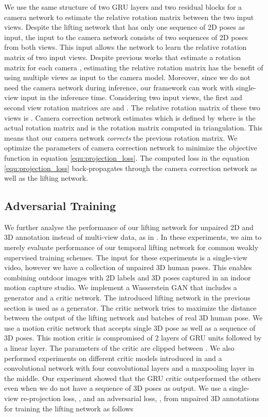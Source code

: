 \documentclass[10pt,twocolumn,letterpaper]{article}
\begin{document}
We use the same structure of two GRU layers and two residual blocks for a camera network to estimate the relative rotation matrix  between the two input views. Despite the lifting network that has only one sequence of 2D poses as input, the input to the camera network consists of two sequences of 2D poses from both views. This input allows the network to learn the relative rotation matrix of two input views. Despite previous works that estimate a rotation matrix for each camera \cite{wandt2020canonpose}, estimating the relative rotation matrix has the benefit of using multiple views as input to the camera model. Moreover, since we do not need the camera network during inference, our framework can work with single-view input in the inference time. Considering two input views, the first and second view rotation matrices are  and . The relative rotation matrix of these two views is . Camera correction network estimates   which is defined by  where  is the actual rotation matrix and  is the rotation matrix computed in triangulation. This means that our camera network \textit{corrects} the previous rotation matrix. We optimize the parameters of camera correction network to minimize the objective function in equation \ref{equ:projection_loss}. The computed loss in the equation \ref{equ:projection_loss} back-propagates through the camera correction network as well as the lifting network.   



\subsection{Adversarial Training}

We further analyse the performance of our lifting network for unpaired 2D and 3D annotation instead of multi-view data, as in \cite{Wandt_2019_CVPR}. In these experiments, we aim to merely evaluate performance of our temporal lifting network for common weakly supervised training schemes. The input for these experiments is a single-view video, however we have a collection of unpaired 3D human poses. This enables combining outdoor images with 2D labels and 3D poses captured in an indoor motion capture studio. We implement a Wasserstein GAN \cite{pmlr-v70-arjovsky17a} that includes a generator and a critic network. The introduced lifting network in the previous section is used as a generator. The critic network tries to maximize the distance between the output of the lifting network and batches of real 3D human pose. We use a motion critic network that accepts single 3D pose as well as a sequence of 3D poses. This motion critic is compromised of 2 layers of GRU units followed by a linear layer. The parameters of the critic are clipped between . We also performed experiments on different critic models introduced in \cite{Wandt_2019_CVPR} and a convolutional network with four convolutional layers and a maxpooling layer in the middle. Our experiment showed that the GRU critic outperformed the others even when we do not have a sequence of 3D poses as output. We use a single-view re-projection loss, , and an adversarial loss, , from unpaired 3D annotations for training the lifting network as follows 
\end{document}
